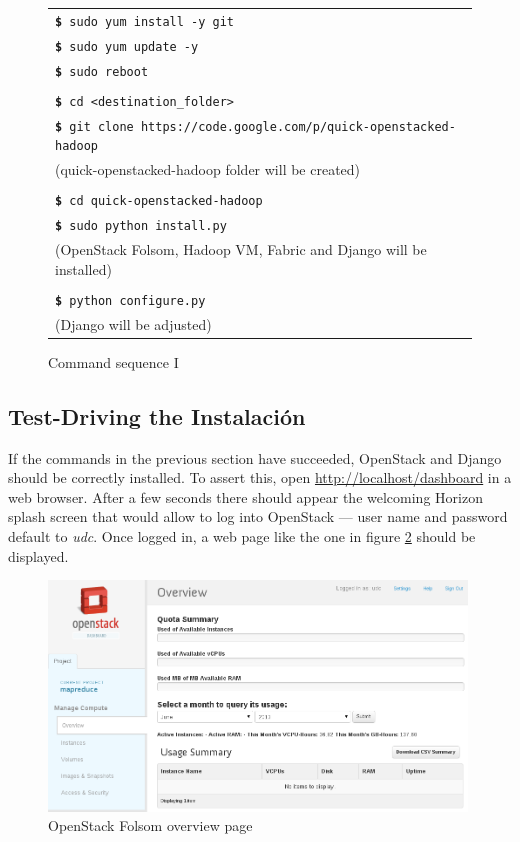 \begin{figure}[tbp]
 \begin{center}
  \begin{tabular}{|l|}
   \hline
   \texttt{{\bf \$} sudo yum install -y git} \\
   \texttt{{\bf \$} sudo yum update -y} \\
   \texttt{{\bf \$} sudo reboot} \\ \\
   \texttt{{\bf \$} cd <destination\_folder>} \\
   \texttt{{\bf \$} git clone https://code.google.com/p/quick-openstacked-hadoop} \\
   (quick-openstacked-hadoop folder will be created) \\ \\
   \texttt{{\bf \$} cd quick-openstacked-hadoop} \\
   \texttt{{\bf \$} sudo python install.py} \\
   (OpenStack Folsom, Hadoop VM, Fabric and Django will be installed) \\ \\
   \texttt{{\bf \$} python configure.py} \\
   (Django will be adjusted) \\
   \hline
  \end{tabular}
  \caption{Command sequence I}
  \label{fig:comandosshell}
 \end{center}
\end{figure}

\subsection{Test-Driving the Instalaci\'on}\label{subsec:testejecucion}
\noindent If the commands in the previous section have succeeded, OpenStack and Django should be correctly installed. To assert this, open \url{http://localhost/dashboard} in a web browser. After a few seconds there should appear the welcoming Horizon splash screen that would allow to log into OpenStack --- user name and password default to \emph{udc}. Once logged in, a web page like the one in figure \ref{fig:homeos} should be displayed.

\begin{figure}[tbp]
\begin{center}
\includegraphics[width=0.99\textwidth]{imagenes/045.png}
\caption{OpenStack Folsom overview page}
\label{fig:homeos}
\end{center}
\end{figure}

